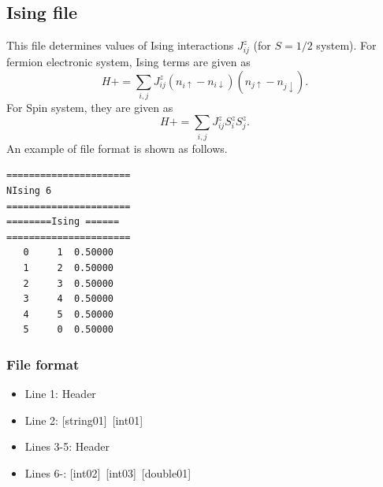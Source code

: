 \newpage
\subsection{Ising file}
This file determines values of Ising interactions $J_{ij}^{z}$ {(for $S=1/2$ system)}.
For fermion electronic system, Ising terms are given as
\begin{equation}
H+=\sum_{i,j}J_{ij}^{z} (n_{i\uparrow}-n_{i\downarrow})(n_{j\uparrow}-n_{j\downarrow} ).
\end{equation}
For Spin system, they are given as
\begin{equation}
H+=\sum_{i,j}J_{ij}^{z} S_ {i}^{z}S_{j}^z.
\end{equation}
An example of file format is shown as follows.

\begin{minipage}{12.5cm}
\begin{screen}
\begin{verbatim}
====================== 
NIsing 6  
====================== 
========Ising ====== 
====================== 
   0     1  0.50000
   1     2  0.50000
   2     3  0.50000
   3     4  0.50000
   4     5  0.50000
   5     0  0.50000
\end{verbatim}
\end{screen}
\end{minipage}

\subsubsection{File format}
 \begin{itemize}
   \item  Line 1:  Header
   \item  Line 2:   [string01]~[int01]
   \item  Lines 3-5:  Header
   \item  Lines 6-: 
   [int02]~[int03]~[double01] 
  \end{itemize}
